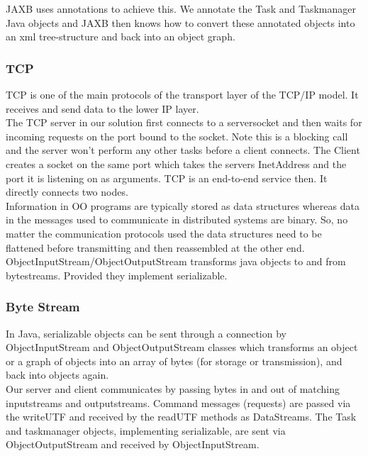 JAXB uses annotations to achieve this. We annotate the Task and Taskmanager Java objects and JAXB then knows how to convert these annotated objects into an xml tree-structure and back into an object graph.\\

\subsubsection{TCP}

TCP is one of the main protocols of the transport layer of the TCP/IP model. It receives and send data to the lower IP layer. \\

The TCP server in our solution first connects to a serversocket and then waits for incoming requests on the port bound to the socket. Note this is a blocking call and the server won't perform any other tasks before a client connects. The Client creates a socket on the same port which takes the servers InetAddress and the port it is listening on as arguments. TCP is an end-to-end service then. It directly connects two nodes.\\

Information in OO programs are typically stored as data structures whereas data in the messages used to communicate in distributed systems are binary. So, no matter the communication protocols used the data structures need to be flattened before transmitting and then reassembled at the other end. ObjectInputStream/ObjectOutputStream transforms java objects to and from bytestreams. Provided they implement serializable.\\ 

\subsubsection{Byte Stream}
In Java,  serializable objects can be sent through a connection by  ObjectInputStream and ObjectOutputStream classes which transforms an object or a graph of objects into an array of bytes (for storage or transmission), and back into objects again. \\

Our server and client communicates by passing bytes in and out of matching inputstreams and outputstreams. Command messages (requests) are passed via the writeUTF and received by the readUTF methods as DataStreams. The Task and taskmanager objects, implementing serializable, are sent via ObjectOutputStream and received by ObjectInputStream. \\

